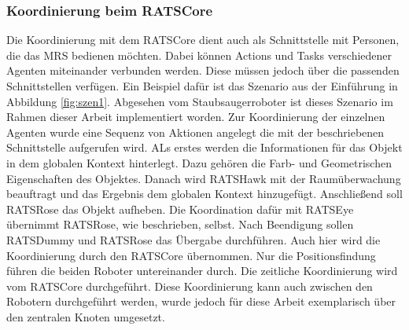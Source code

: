 \subsubsection{Koordinierung beim RATSCore}
Die Koordinierung mit dem RATSCore dient auch als Schnittstelle mit Personen, die das MRS bedienen möchten. Dabei können Actions und Tasks verschiedener Agenten miteinander verbunden werden. Diese müssen jedoch über die passenden Schnittstellen verfügen. Ein Beispiel dafür ist das Szenario aus der Einführung in Abbildung \ref{fig:szen1}. Abgesehen vom Staubsaugerroboter ist dieses Szenario im Rahmen dieser Arbeit implementiert worden. Zur Koordinierung der einzelnen Agenten wurde eine Sequenz von Aktionen angelegt die mit der beschriebenen Schnittstelle aufgerufen wird. ALs erstes werden die Informationen für das Objekt in dem globalen Kontext hinterlegt. Dazu gehören die Farb- und Geometrischen Eigenschaften des Objektes. Danach wird RATSHawk mit der Raumüberwachung beauftragt und das Ergebnis dem globalen Kontext hinzugefügt. Anschließend soll RATSRose das Objekt aufheben. Die Koordination dafür mit RATSEye übernimmt RATSRose, wie beschrieben, selbst. Nach Beendigung sollen RATSDummy und RATSRose das Übergabe durchführen. Auch hier wird die Koordinierung durch den RATSCore übernommen. Nur die Positionsfindung führen die beiden Roboter untereinander durch. Die zeitliche Koordinierung wird vom RATSCore durchgeführt. Diese Koordinierung kann auch zwischen den Robotern durchgeführt werden, wurde jedoch für diese Arbeit exemplarisch über den zentralen Knoten umgesetzt.

